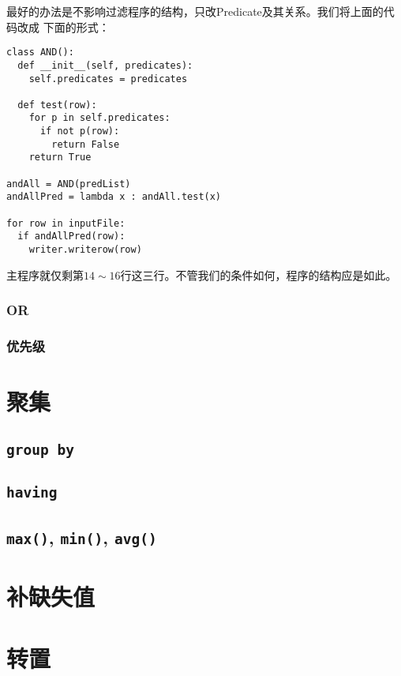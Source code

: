 \documentclass[11pt]{article}
\newcommand{\id}[1]{\texttt{#1}}
\newcommand{\kw}[1]{\texttt{\textbf{#1}}}
\begin{document}
最好的办法是不影响过滤程序的结构，只改Predicate及其关系。我们将上面的代码改成
下面的形式：
\begin{lstlisting}
class AND():
  def __init__(self, predicates):
    self.predicates = predicates

  def test(row):
    for p in self.predicates:
      if not p(row):
        return False
    return True

andAll = AND(predList)
andAllPred = lambda x : andAll.test(x)

for row in inputFile:
  if andAllPred(row):
    writer.writerow(row)
\end{lstlisting}
主程序就仅剩第$14 \sim 16$行这三行。不管我们的条件如何，程序的结构应是如此。
\subsubsection{OR}
\subsubsection{优先级}
\section{聚集}
\subsection{\kw{group by}}
\subsection{\kw{having}}
\subsection{\id{max()}, \id{min()}, \id{avg()}}
\section{补缺失值}

\section{转置}
\end{document}
